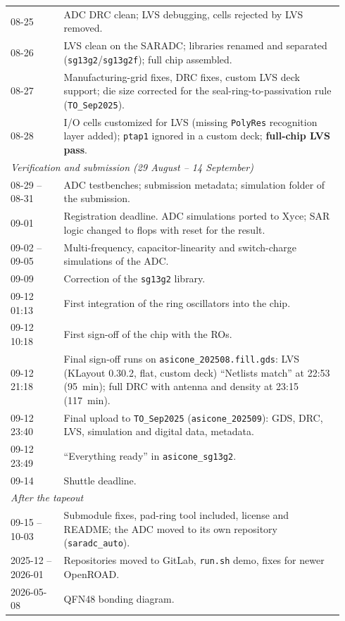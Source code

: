 \documentclass[10pt,a4paper]{article}
\begin{document}
\begin{longtable}{p{0.15\linewidth}p{0.79\linewidth}}
08-25 & ADC DRC clean; LVS debugging, cells rejected by LVS removed. \\
08-26 & LVS clean on the SARADC; libraries renamed and separated (\texttt{sg13g2}/\texttt{sg13g2f}); full chip assembled. \\
08-27 & Manufacturing-grid fixes, DRC fixes, custom LVS deck support; die size corrected for the
  seal-ring-to-passivation rule (\texttt{TO\_Sep2025}). \\
08-28 & I/O cells customized for LVS (missing \texttt{PolyRes} recognition layer added); \texttt{ptap1}
  ignored in a custom deck; \textbf{full-chip LVS pass}. \\
\multicolumn{2}{l}{\textit{Verification and submission (29 August -- 14 September)}} \\
08-29 -- 08-31 & ADC testbenches; submission metadata; simulation folder of the submission. \\
09-01 & Registration deadline. ADC simulations ported to Xyce; SAR logic changed to flops with reset for the result. \\
09-02 -- 09-05 & Multi-frequency, capacitor-linearity and switch-charge simulations of the ADC. \\
09-09 & Correction of the \texttt{sg13g2} library. \\
09-12 01:13 & First integration of the ring oscillators into the chip. \\
09-12 10:18 & First sign-off of the chip with the ROs. \\
09-12 21:18 & Final sign-off runs on \texttt{asicone\_202508.fill.gds}: LVS (KLayout 0.30.2, flat, custom deck) ``Netlists match'' at 22:53 (\SI{95}{min}); full DRC with antenna and density at 23:15 (\SI{117}{min}). \\
09-12 23:40 & Final upload to \texttt{TO\_Sep2025} (\texttt{asicone\_202509}): GDS, DRC, LVS, simulation and digital data, metadata. \\
09-12 23:49 & ``Everything ready'' in \texttt{asicone\_sg13g2}. \\
09-14 & Shuttle deadline. \\
\multicolumn{2}{l}{\textit{After the tapeout}} \\
09-15 -- 10-03 & Submodule fixes, pad-ring tool included, license and README; the ADC moved to its own repository (\texttt{saradc\_auto}). \\
2025-12 -- 2026-01 & Repositories moved to GitLab, \texttt{run.sh} demo, fixes for newer OpenROAD. \\
2026-05-08 & QFN48 bonding diagram. \\

\end{longtable}
\end{document}
